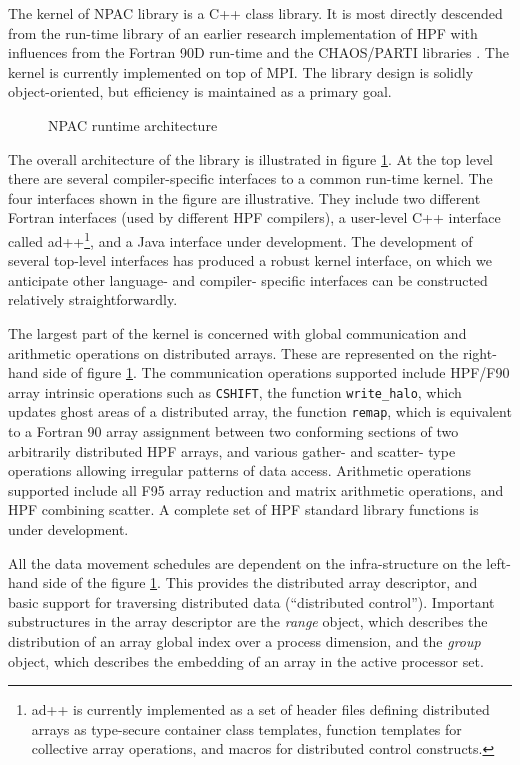 The kernel of NPAC library is a C++ class library.  It is
most directly descended from the run-time library of an earlier
research implementation of HPF \cite{shpf} with influences from the
Fortran 90D run-time and the CHAOS/PARTI libraries
\cite{structured,irregular,CHAOS}.
The kernel is currently implemented on top of MPI.  The library design
is solidly object-oriented, but efficiency is maintained as a primary
goal.

\begin{figure}[bt]
\centerline{}
\caption{NPAC runtime architecture\label{architecture}}
\end{figure}

The overall architecture of the library is illustrated in figure
\ref{architecture}.  At the top level there are several
compiler-specific interfaces to a common run-time kernel.  
The four interfaces shown in the figure are illustrative.
They include two different Fortran interfaces (used by different HPF
compilers), a user-level C++ interface called ad++\footnote{ad++ is
currently implemented as a set of header files defining distributed
arrays as type-secure container class templates, function templates for
collective array operations, and macros for distributed control
constructs.}, and a Java interface under development.
The development of several top-level
interfaces has produced a robust kernel interface, on which we
anticipate other language- and compiler- specific interfaces can be
constructed relatively straightforwardly.

The largest part of the kernel is concerned with global communication
and arithmetic operations on distributed arrays.  These are represented on
the right-hand side of figure \ref{architecture}.  
The communication operations supported include HPF/F90 array intrinsic
operations such as {\tt CSHIFT}, the function {\tt write\_halo}, which
updates ghost areas of a distributed array, the function {\tt remap},
which is equivalent to a Fortran 90 array assignment between
two conforming sections of two arbitrarily distributed HPF arrays,
and various gather- and scatter- type operations allowing irregular patterns
of data access.  Arithmetic operations supported include all F95
array reduction and matrix arithmetic operations, and HPF
combining scatter.  A complete set of HPF standard library functions
is under development.

All the data movement schedules are dependent on the infra-structure on the
left-hand side of the figure \ref{architecture}.  This provides the
distributed array descriptor, and basic support for traversing
distributed data (``distributed control'').  Important substructures
in the array descriptor are the {\em range} object, which describes
the distribution of an array global index over a process
dimension, and the {\em group} object, which describes the embedding
of an array in the active processor set.

